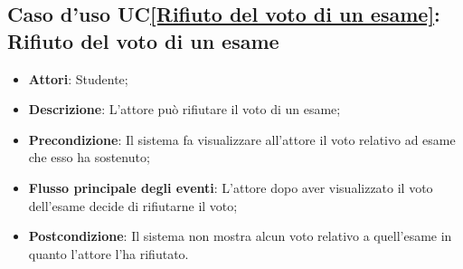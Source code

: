 %	
%	
%
%	
%	

\subsection{Caso d'uso UC\ref{Rifiuto del voto di un esame}: Rifiuto del voto di un esame}
\begin{itemize}
	\item \textbf{Attori}: Studente;
	\item \textbf{Descrizione}: L'attore può rifiutare il voto di un esame;
	\item \textbf{Precondizione}: Il sistema fa visualizzare all'attore il voto relativo ad esame che esso ha sostenuto;
	\item \textbf{Flusso principale degli eventi}: L'attore dopo aver visualizzato il voto dell'esame decide di rifiutarne il voto;
	\item \textbf{Postcondizione}: Il sistema non mostra alcun voto relativo a quell'esame in quanto l'attore l'ha rifiutato.
\end{itemize}

